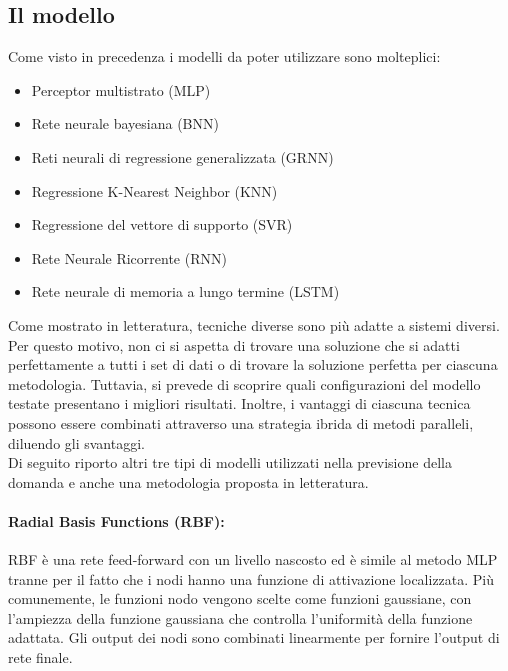 \documentclass[12pt,a4paper]{report}
\begin{document}
\subsection{Il modello}
Come visto in precedenza i modelli da poter utilizzare sono molteplici:
\begin{itemize}
    \item Perceptor multistrato (MLP)
    \item Rete neurale bayesiana (BNN)
    \item Reti neurali di regressione generalizzata (GRNN)
    \item Regressione K-Nearest Neighbor (KNN)
    \item Regressione del vettore di supporto (SVR)
    \item Rete Neurale Ricorrente (RNN)
    \item Rete neurale di memoria a lungo termine (LSTM)
\end{itemize}

Come mostrato in letteratura, tecniche diverse sono più adatte a sistemi diversi. Per questo motivo, non ci si aspetta di trovare una soluzione che si adatti perfettamente a tutti i set di dati o di trovare la soluzione perfetta per ciascuna metodologia. Tuttavia, si prevede di scoprire quali configurazioni del modello testate presentano i migliori risultati.
Inoltre, i vantaggi di ciascuna tecnica possono essere combinati attraverso una strategia ibrida di metodi paralleli, diluendo gli svantaggi.\\
Di seguito riporto altri tre tipi di modelli utilizzati nella previsione della domanda e anche una metodologia proposta in letteratura.

\paragraph*{Radial Basis Functions (RBF):}
RBF è una rete feed-forward con un livello nascosto ed è simile al metodo MLP tranne per il fatto che i nodi hanno una funzione di attivazione localizzata. Più comunemente, le funzioni nodo vengono scelte come funzioni gaussiane, con l'ampiezza della funzione gaussiana che controlla l'uniformità della funzione adattata. Gli output dei nodi sono combinati linearmente per fornire l'output di rete finale.
 
\end{document}
